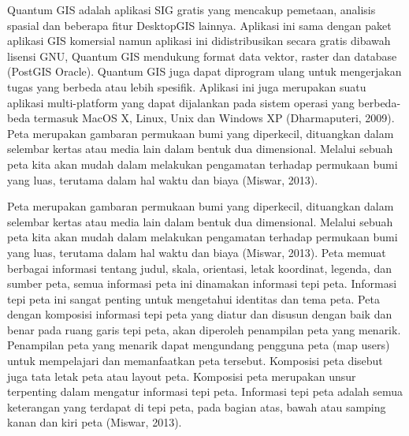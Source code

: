 Quantum GIS adalah aplikasi SIG gratis yang mencakup pemetaan, analisis spasial dan beberapa fitur DesktopGIS lainnya. Aplikasi ini sama dengan paket aplikasi GIS komersial namun aplikasi ini didistribusikan secara gratis dibawah lisensi GNU, Quantum GIS mendukung format data vektor, raster dan database (PostGIS Oracle). Quantum GIS juga dapat diprogram ulang untuk mengerjakan tugas yang berbeda atau lebih spesifik. Aplikasi ini juga merupakan suatu aplikasi multi-platform yang dapat dijalankan pada sistem operasi yang berbeda-beda termasuk MacOS X, Linux, Unix dan Windows XP (Dharmaputeri, 2009).
Peta merupakan gambaran permukaan bumi yang diperkecil, dituangkan dalam selembar kertas atau media lain dalam bentuk dua dimensional. Melalui sebuah peta kita akan mudah dalam melakukan pengamatan terhadap permukaan bumi yang luas, terutama dalam hal waktu dan biaya (Miswar, 2013).

Peta merupakan gambaran permukaan bumi yang diperkecil, dituangkan dalam selembar kertas atau media lain dalam bentuk dua dimensional. Melalui sebuah peta kita akan mudah dalam melakukan pengamatan terhadap permukaan bumi yang luas, terutama dalam hal waktu dan biaya (Miswar, 2013).
Peta memuat berbagai informasi tentang judul, skala, orientasi, letak koordinat, legenda, dan sumber peta, semua informasi peta ini dinamakan informasi tepi peta. Informasi tepi peta ini sangat penting untuk mengetahui identitas dan tema peta. Peta dengan komposisi informasi tepi peta yang diatur dan disusun dengan baik dan benar pada ruang garis tepi peta, akan diperoleh penampilan peta yang menarik. Penampilan peta yang menarik dapat mengundang pengguna peta (map users) untuk mempelajari dan memanfaatkan peta tersebut. Komposisi peta disebut juga tata letak peta atau layout peta. Komposisi peta merupakan unsur terpenting dalam mengatur informasi tepi peta. Informasi tepi peta adalah semua keterangan yang terdapat di tepi peta, pada bagian atas, bawah atau samping kanan dan kiri peta (Miswar, 2013).

